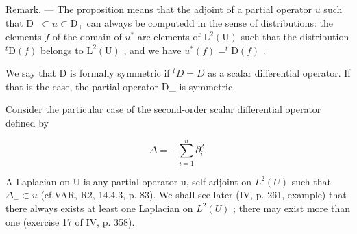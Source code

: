 Remark. --- The proposition means that the adjoint of a partial operator \(u\) such that \(\mathrm{D}_{-} \subset u \subset \mathrm{D}_{+}\) can always be computedd in the sense of distributions: the elements \(f\) of the domain of \(u^{*}\) are elements of \(\mathrm{L}^{2}(\mathrm{U})\) such that the distribution \(^{t}\mathrm{D}(f)\) belongs to \(\mathrm{L}^{2}(\mathrm{U})\) , and we have \(u^{*}(f) = ^{t}\mathrm{D}(f)\) .

We say that D is formally symmetric if \({}^{t}D = D\) as a scalar differential operator. If that is the case, the partial operator D\_ is symmetric.

Consider the particular case of the second-order scalar differential operator defined by

\[
\Delta = - \sum_ {i = 1} ^ {n} \partial_ {i} ^ {2}.
\]

A Laplacian on U is any partial operator u, self-adjoint on \(L^{2}(U)\) such that \(\Delta_{-} \subset u\) (cf.VAR, R2, 14.4.3, p. 83). We shall see later (IV, p. 261, example) that there always exists at least one Laplacian on \(L^{2}(U)\) ; there may exist more than one (exercise 17 of IV, p. 358).
\relax{}
